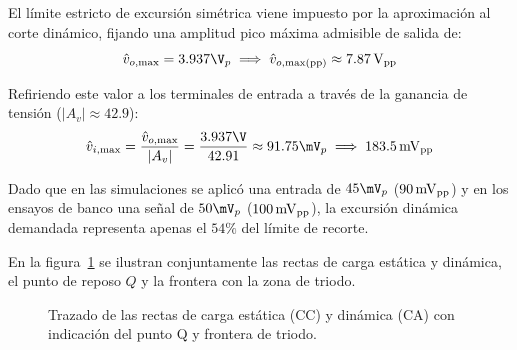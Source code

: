 El límite estricto de excursión simétrica viene impuesto por la aproximación al corte dinámico, fijando una amplitud pico
máxima admisible de salida de:
\begin{equation}
  \hat{v}_{o,\max} = 3.937\V_p \implies \hat{v}_{o,\max(\mathrm{pp})} \approx 7.87\Vpp
\end{equation}

Refiriendo este valor a los terminales de entrada a través de la ganancia de tensión ($|A_v| \approx 42.9$):
\begin{equation}
  \hat{v}_{i,\max} = \frac{\hat{v}_{o,\max}}{|A_v|} = \frac{3.937\V}{42.91} \approx 91.75\mV_p \implies 183.5\mVpp
\end{equation}

Dado que en las simulaciones se aplicó una entrada de $45\mV_p$ ($90\,\mathrm{mV}_{\mathrm{pp}}$) y en los ensayos de banco una señal de
$50\mV_p$ ($100\,\mathrm{mV}_{\mathrm{pp}}$), la excursión dinámica demandada representa apenas el $54\%$ del límite de recorte.

En la figura~\ref{fig:plot_rectas_de_carga} se ilustran conjuntamente las rectas de carga estática y dinámica, el punto
de reposo $Q$ y la frontera con la zona de triodo.

\begin{figure}[!ht]
  \centering
  
  \caption{Trazado de las rectas de carga estática (CC) y dinámica (CA) con indicación del punto Q y frontera de triodo.}
  \label{fig:plot_rectas_de_carga}
\end{figure}
